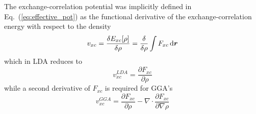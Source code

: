 The exchange-correlation potential was implicitly defined in Eq.~(\ref{eq:effective_pot}) 
as the functional derivative of the exchange-correlation energy with respect to the density
\begin{equation}
    v_{xc} = \frac{\delta E_{xc}[\rho]}{\delta \rho} 
	= \frac{\delta}{\delta \rho} \int F_{xc} \,\mathrm{d} \boldsymbol r
\end{equation}
which in LDA reduces to
\begin{equation}
    v_{xc}^{LDA} = \frac{\partial F_{xc}}{\partial \rho}
\end{equation}
while a second derivative of $F_{xc}$ is required for GGA's
\begin{equation}
    v_{xc}^{GGA} = \frac{\partial F_{xc}}{\partial \rho} - 
	\nabla\cdot\frac{\partial F_{xc}}{\partial\nabla\rho}
\end{equation}


